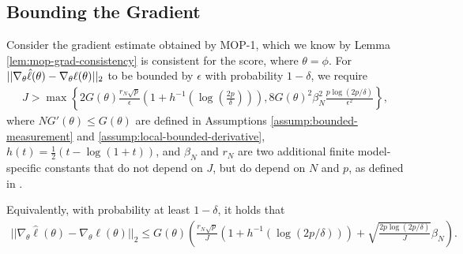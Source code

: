 \documentclass{article}
\begin{document}
\subsection{Bounding the Gradient}


\begin{lem}
    \label{lemma:grad_bound}
    Consider the gradient estimate obtained by MOP-1, which we know by Lemma \ref{lem:mop-grad-consistency} is consistent for the score, where $\theta = \phi$. For $||\nabla_\theta \hat{\ell}(\theta) - \nabla_\theta \ell(\theta)||_2$ to be bounded by $\epsilon$ with probability $1-\delta$, we require
    \begin{align}
    J > \max\left\{2G(\theta)\frac{r_N\sqrt{p}}{\epsilon}\left(1+h^{-1}\left(\log\left(\frac{2p}{\delta}\right)\right)\right), 8G(\theta)^2\beta_N^2\frac{p\log(2p/\delta)}{\epsilon^2}\right\},
    \end{align}
    where $NG'(\theta) \leq G(\theta)$ are defined in Assumptions \ref{assump:bounded-measurement} and \ref{assump:local-bounded-derivative}, $h(t) = \frac{1}{2}(t - \log(1+t))$, and $\beta_N$ and $r_N$ are two additional finite model-specific constants that do not depend on $J$, but do depend on $N$ and $p$, as defined in \cite{delmoral2011ci}. 

    Equivalently, with probability at least $1-\delta$, it holds that
    \begin{align}
        ||\nabla_\theta \hat\ell(\theta) - \nabla_\theta \ell(\theta)||_2 \leq G(\theta)\left(\frac{r_N\sqrt{p}}{J}(1+h^{-1}(\log(2p/\delta))) + \sqrt{\frac{2p\log(2p/\delta)}{J}}\beta_N\right).
    \end{align}
\end{lem}
\end{document}
